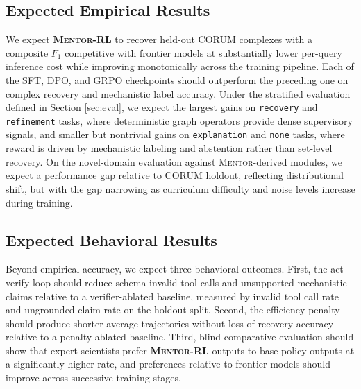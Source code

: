 \documentclass[thesis,letterpaper,12pt]{utthesis}
\begin{document}
\subsection{Expected Empirical Results}
We expect \textbf{\textsc{Mentor-RL}} to recover held-out CORUM complexes with a composite $F_1$ competitive with frontier models at substantially lower per-query inference cost while improving monotonically across the training pipeline. Each of the SFT, DPO, and GRPO checkpoints should outperform the preceding one on complex recovery and mechanistic label accuracy. Under the stratified evaluation defined in Section \ref{sec:eval}, we expect the largest gains on \texttt{recovery} and \texttt{refinement} tasks, where deterministic graph operators provide dense supervisory signals, and smaller but nontrivial gains on \texttt{explanation} and \texttt{none} tasks, where reward is driven by mechanistic labeling and abstention rather than set-level recovery. On the novel-domain evaluation against \textsc{Mentor}-derived modules, we expect a performance gap relative to CORUM holdout, reflecting distributional shift, but with the gap narrowing as curriculum difficulty and noise levels increase during training.

\subsection{Expected Behavioral Results}
Beyond empirical accuracy, we expect three behavioral outcomes. First, the act-verify loop should reduce schema-invalid tool calls and unsupported mechanistic claims relative to a verifier-ablated baseline, measured by invalid tool call rate and ungrounded-claim rate on the holdout split. Second, the efficiency penalty should produce shorter average trajectories without loss of recovery accuracy relative to a penalty-ablated baseline. Third, blind comparative evaluation should show that expert scientists prefer \textbf{\textsc{Mentor-RL}} outputs to base-policy outputs at a significantly higher rate, and preferences relative to frontier models should improve across successive training stages.
\end{document}
